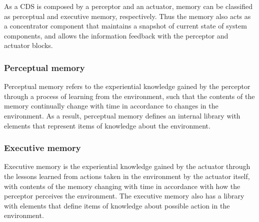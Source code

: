 \documentclass[ENG,PhD]{cinvestav}
\begin{document}
As a CDS is composed by a perceptor and an actuator, memory can be classified as perceptual and executive memory, respectively.
Thus the memory also acts as a concentrator component that maintains a snapshot of current state of system components, and allows the information feedback with the perceptor and actuator blocks.

\subsubsection*{Perceptual memory}
Perceptual memory refers to the experiential knowledge gained by the perceptor through a process of learning from the environment, such that the contents of the memory continually change with time in accordance to changes in the environment. %
As a result, perceptual memory defines an internal library with elements that represent items of knowledge about the environment.

\subsubsection*{Executive memory}
Executive memory is the experiential knowledge gained by the actuator through the lessons learned from actions taken in the environment by the actuator itself, with contents of the memory changing with time in accordance with how the perceptor perceives the environment. %
The executive memory also has a library with elements that define items of knowledge about possible action in the environment.
\end{document}
